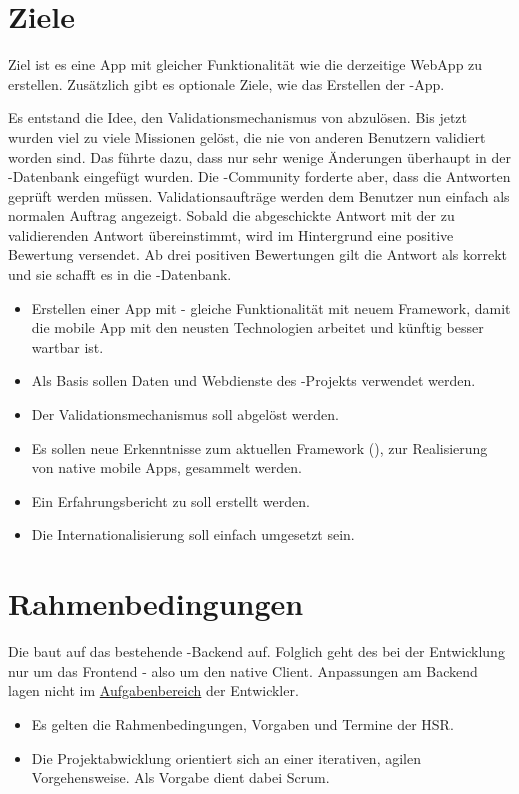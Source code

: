 \section{Ziele}
\label{tb-einfuehrung-ziele}
Ziel ist es eine  App mit gleicher Funktionalität wie die derzeitige \gls{WebApp} zu erstellen.
Zusätzlich gibt es optionale Ziele, wie das Erstellen der -App.

Es entstand die Idee, den Validationsmechanismus von \kort{} abzulösen.
Bis jetzt wurden viel zu viele Missionen gelöst, die nie von anderen Benutzern validiert worden sind.
Das führte dazu, dass nur sehr wenige Änderungen überhaupt in der -Datenbank eingefügt wurden.
Die -Community forderte aber, dass die Antworten geprüft werden müssen.
Validationsaufträge werden dem Benutzer nun einfach als normalen Auftrag angezeigt.
Sobald die abgeschickte Antwort mit der zu validierenden Antwort übereinstimmt, wird im Hintergrund eine positive Bewertung versendet.
Ab drei positiven Bewertungen gilt die Antwort als korrekt und sie schafft es in die -Datenbank.

\begin{itemize}
	\item Erstellen einer  App mit  - gleiche Funktionalität mit neuem Framework, damit die mobile App mit den neusten Technologien arbeitet und künftig besser wartbar ist.
	\item Als Basis sollen Daten und Webdienste des -Projekts verwendet werden.
	\item Der Validationsmechanismus soll abgelöst werden.
	\item Es sollen neue Erkenntnisse zum aktuellen Framework (), zur Realisierung von native mobile Apps, gesammelt werden.
	\item Ein Erfahrungsbericht zu  soll erstellt werden.
	\item Die Internationalisierung soll einfach umgesetzt sein.
\end{itemize}

\section{Rahmenbedingungen}
Die  baut auf das bestehende \kort{}-Backend auf.
Folglich geht des bei der Entwicklung nur um das Frontend - also um den native Client.
Anpassungen am Backend lagen nicht im \hyperref[pd-anforderungsspezifikation]{Aufgabenbereich} der Entwickler.
\begin{itemize}
	\item Es gelten die Rahmenbedingungen, Vorgaben und Termine der HSR.
	\item Die Projektabwicklung orientiert sich an einer iterativen, agilen Vorgehensweise. 
	Als Vorgabe dient dabei Scrum.
\end{itemize}

